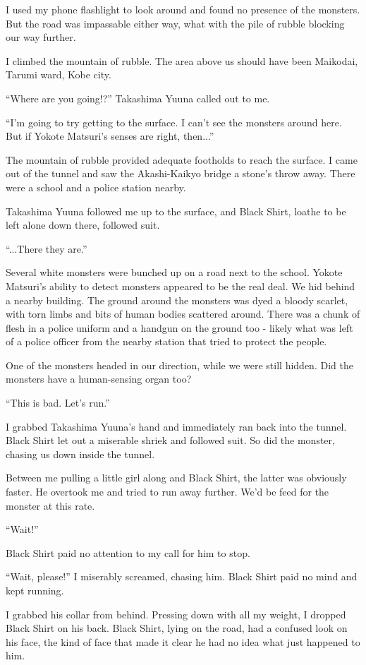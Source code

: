 I used my phone flashlight to look around and found no presence of the monsters. But the road was impassable either way, what with the pile of rubble blocking our way further.

I climbed the mountain of rubble. The area above us should have been Maikodai, Tarumi ward, Kobe city.

``Where are you going!?'' Takashima Yuuna called out to me.

``I'm going to try getting to the surface. I can't see the monsters around here. But if Yokote Matsuri's senses are right, then...''

The mountain of rubble provided adequate footholds to reach the surface. I came out of the tunnel and saw the Akashi-Kaikyo bridge a stone's throw away. There were a school and a police station nearby.

Takashima Yuuna followed me up to the surface, and Black Shirt, loathe to be left alone down there, followed suit.

``...There they are.''

Several white monsters were bunched up on a road next to the school. Yokote Matsuri's ability to detect monsters appeared to be the real deal. We hid behind a nearby building. The ground around the monsters was dyed a bloody scarlet, with torn limbs and bits of human bodies scattered around. There was a chunk of flesh in a police uniform and a handgun on the ground too - likely what was left of a police officer from the nearby station that tried to protect the people.

One of the monsters headed in our direction, while we were still hidden. Did the monsters have a human-sensing organ too?

``This is bad. Let's run.''

I grabbed Takashima Yuuna's hand and immediately ran back into the tunnel. Black Shirt let out a miserable shriek and followed suit. So did the monster, chasing us down inside the tunnel.

Between me pulling a little girl along and Black Shirt, the latter was obviously faster. He overtook me and tried to run away further. We'd be feed for the monster at this rate.

``Wait!''

Black Shirt paid no attention to my call for him to stop.

``Wait, please!'' I miserably screamed, chasing him. Black Shirt paid no mind and kept running.

I grabbed his collar from behind. Pressing down with all my weight, I dropped Black Shirt on his back. Black Shirt, lying on the road, had a confused look on his face, the kind of face that made it clear he had no idea what just happened to him.

